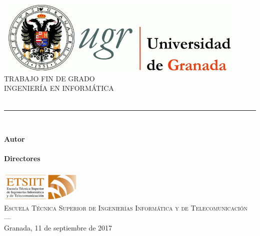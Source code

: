\begin{titlepage}
 
 
\newlength{\centeroffset}
\setlength{\centeroffset}{-0.5\oddsidemargin}
\addtolength{\centeroffset}{0.5\evensidemargin}
\thispagestyle{empty}

\noindent\hspace*{\centeroffset}\begin{minipage}{\textwidth}

\centering
\includegraphics[width=0.9\textwidth]{imagenes/logo_ugr.jpg}\\[1.4cm]

\textsc{ \Large TRABAJO FIN DE GRADO\\[0.2cm]}
\textsc{ INGENIERÍA EN INFORMÁTICA}\\[1cm]
% 
{\Huge\bfseries \myTitle\\
}
\noindent\rule[-1ex]{\textwidth}{3pt}\\[3.5ex]
{\large\bfseries} %
\end{minipage}

\vspace{2.5cm}
\noindent\hspace*{\centeroffset}\begin{minipage}{\textwidth}
\centering

\textbf{Autor}\\ {\myName}\\[2.5ex]
\textbf{Directores}\\
{\myProf}\\[2cm]
\includegraphics[width=0.3\textwidth]{imagenes/etsiit_logo.png}\\[0.1cm]
\textsc{Escuela Técnica Superior de Ingenierías Informática y de Telecomunicación}\\
\textsc{---}\\
Granada, 11 de septiembre de 2017
\end{minipage}
\end{titlepage}


